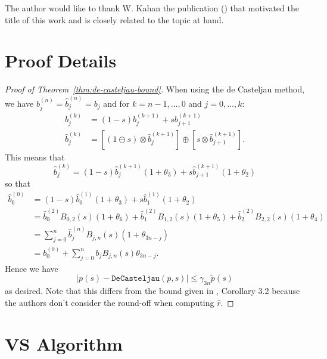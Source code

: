 \documentclass[letterpaper,10pt]{article}
\theoremstyle{definition}
\begin{document}
The author would like to thank W. Kahan the publication
(\cite{Kahan1972}) that motivated the title of this work and
is closely related to the topic at hand.




\appendix

\section{Proof Details}\label{sec:appendix-proof-details}

\begin{proof}[Proof of Theorem~\ref{thm:de-casteljau-bound}]
When using the de Casteljau method, we have
\(b_j^{(n)} = \widehat{b}_j^{(n)} = b_j\) and for \(k = n - 1, \ldots, 0\)
and \(j = 0, \ldots, k\):
\begin{align}
b_j^{(k)} &= (1 - s) b_j^{(k + 1)} + s b_{j + 1}^{(k + 1)} \\
\widehat{b}_j^{(k)} &= \left[(1 \ominus s) \otimes
  \widehat{b}_j^{(k + 1)}\right]
  \oplus \left[s \otimes \widehat{b}_{j + 1}^{(k + 1)}\right].
\end{align}
This means that
\begin{equation}
\widehat{b}_j^{(k)} = (1 - s) \widehat{b}_j^{(k + 1)} (1 + \theta_3)
+ s \widehat{b}_{j + 1}^{(k + 1)} (1 + \theta_2)
\end{equation}
so that
\begin{align}
\widehat{b}_0^{(0)} &= (1 - s) \widehat{b}_0^{(1)} (1 + \theta_3)
+ s \widehat{b}_{1}^{(1)} (1 + \theta_2) \\
&= \widehat{b}_0^{(2)} B_{0, 2}(s) (1 + \theta_6) +
\widehat{b}_1^{(2)} B_{1, 2}(s) (1 + \theta_5) +
\widehat{b}_2^{(2)} B_{2, 2}(s) (1 + \theta_4) \\
&= \sum_{j = 0}^n \widehat{b}_j^{(n)} B_{j, n}(s) (1 + \theta_{3n - j}) \\
&= b_0^{(0)} + \sum_{j = 0}^n b_j B_{j, n}(s) \theta_{3n - j}.
\end{align}
Hence we have
\begin{equation}
\left|p(s) - \mathtt{DeCasteljau}(p, s)\right| \leq \gamma_{3n}
  \widetilde{p}(s)
\end{equation}
as desired. Note that this differs from the bound given in
\cite{Mainar1999}, Corollary 3.2 because the authors don't consider the
round-off when computing \(\widehat{r}\).
\end{proof}

\section{VS Algorithm}\label{sec:vs-algorithm}
\end{document}
